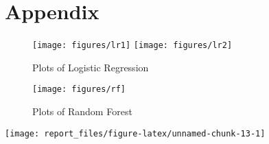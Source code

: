 \documentclass[11pt,]{article}
\begin{document}
\hypertarget{appendix}{%
\section{Appendix}\label{appendix}}

\begin{figure}

{\centering \texttt{[image: figures/lr1]} \texttt{[image: figures/lr2]} 

}

\caption{Plots of Logistic Regression}\label{fig:unnamed-chunk-11}
\end{figure}

\begin{figure}

{\centering \texttt{[image: figures/rf]} 

}

\caption{Plots of Random Forest}\label{fig:unnamed-chunk-12}
\end{figure}

\begin{center}\texttt{[image: report\_files/figure-latex/unnamed-chunk-13-1]} \end{center}





\newpage
\singlespacing 

\end{document}
